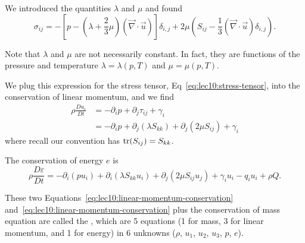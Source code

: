 
\lecture{}

\begin{recall}
We introduced the quantities $\lambda$ and $\mu$ and found
\begin{equation}\label{eq:lec10:stress-tensor}
\sigma_{ij}=-\left[p -\left(\lambda+\frac{2}{3}\mu\right)(\vec{\nabla}\cdot\vec{u})\right]\delta_{i,j}+2\mu\left(S_{ij}-\frac{1}{3}(\vec{\nabla}\cdot\vec{u})\delta_{i,j}\right).
\end{equation}
\end{recall}

\begin{node}
Note that $\lambda$ and $\mu$ are not necessarily constant. In fact,
they are functions of the pressure and temperature
$\lambda=\lambda(p,T)$ and $\mu=\mu(p,T)$.
\end{node}

\begin{node}
We plug this expression for the stress tensor,
Eq~\eqref{eq:lec10:stress-tensor}, into the conservation of linear
momentum, and we find
\begin{subequations}\label{eq:lec10:linear-momentum-conservation}
  \begin{align}
\rho\frac{D u_{i}}{D t} &= -\partial_{i}p + \partial_{j}\tau_{ij}+\gamma_{i}\\
&=-\partial_{i}p+\partial_{j}(\lambda S_{kk})+\partial_{j}(2\mu S_{ij})+\gamma_{i}
  \end{align}
\end{subequations}
where recall our convention has $\operatorname{tr}(S_{ij})=S_{kk}$.
\end{node}

\begin{node}
The conservation of energy $e$ is
\begin{equation}\label{eq:lec10:total-energy-conservation}
\rho\frac{D\varepsilon}{D t}
=-\partial_{i}(pu_{i})+\partial_{i}(\lambda
S_{kk}u_{i})+\partial_{j}(2\mu S_{ij}u_{j})+\gamma_{i}u_{i}
-q_{i}u_{i}+\rho Q.
\end{equation}
\end{node}

\begin{definition}
These two Equations~\eqref{eq:lec10:linear-momentum-conservation} and~\eqref{eq:lec10:linear-momentum-conservation}
plus the conservation of mass equation
are called the ,
which are 5 equations (1 for mass, 3 for linear momentum, and 1 for energy)
in 6 unknowns ($\rho$, $u_{1}$, $u_{2}$, $u_{3}$, $p$, $e$).
\end{definition}

